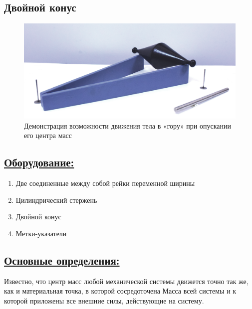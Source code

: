 \documentclass[14pt,a4paper,oneside]{extarticle}	%
\begin{document}
	

	\begin{center}
		\subsection*{Двойной конус}
	\end{center}
	
	\begin{figure}[H] 
		\centering 
		\includegraphics[width=0.9\linewidth]{center-3.png}
		\caption{Демонстрация возможности движения тела в «гору» при опускании его центра масс}
		\label{center-3}
	\end{figure}
	
	\subsection*{\underline{Оборудование:}}
	
	\begin{enumerate} 
		\item Две соединенные между собой рейки переменной ширины
		\item Цилиндрический стержень 
		\item Двойной конус
		\item Метки-указатели
	\end{enumerate}

	\newpage
	\subsection*{\underline{Основные определения:}}
	
	Известно, что центр масс любой механической системы движется точно так же, как и материальная точка, в которой сосредоточена
	Масса всей системы и к которой приложены все внешние силы, действующие на систему.
	
\end{document}
